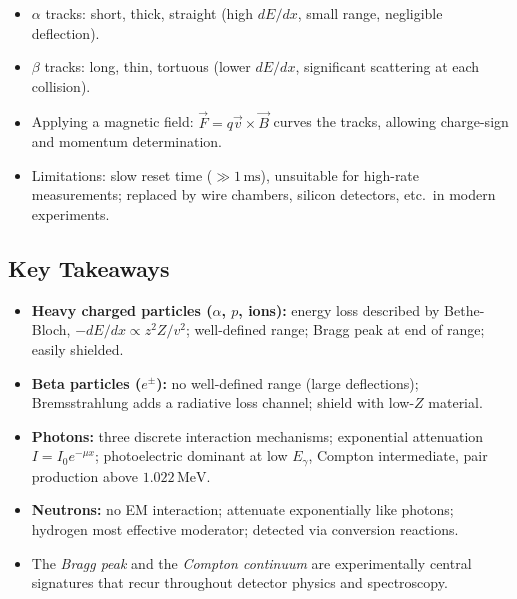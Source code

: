 \begin{itemize}
  \item $\alpha$ tracks: short, thick, straight (high $dE/dx$, small range,
  negligible deflection).
  \item $\beta$ tracks: long, thin, tortuous (lower $dE/dx$, significant
  scattering at each collision).
  \item Applying a magnetic field: $\vec{F} = q\vec{v}\times\vec{B}$ curves the
  tracks, allowing charge-sign and momentum determination.
  \item Limitations: slow reset time ($\gg 1\,\text{ms}$), unsuitable for high-rate
  measurements; replaced by wire chambers, silicon detectors, etc.\ in modern
  experiments.
\end{itemize}

\subsection*{Key Takeaways}
\begin{itemize}
  \item \textbf{Heavy charged particles ($\alpha$, $p$, ions):} energy loss described by
  Bethe-Bloch, $-dE/dx \propto z^2 Z/v^2$; well-defined range; Bragg peak at
  end of range; easily shielded.
  \item \textbf{Beta particles ($e^\pm$):} no well-defined range (large deflections);
  Bremsstrahlung adds a radiative loss channel; shield with low-$Z$ material.
  \item \textbf{Photons:} three discrete interaction mechanisms; exponential
  attenuation $I = I_0 e^{-\mu x}$; photoelectric dominant at low $E_\gamma$,
  Compton intermediate, pair production above $1.022\,\text{MeV}$.
  \item \textbf{Neutrons:} no EM interaction; attenuate exponentially like photons;
  hydrogen most effective moderator; detected via conversion reactions.
  \item The \emph{Bragg peak} and the \emph{Compton continuum} are experimentally
  central signatures that recur throughout detector physics and spectroscopy.
\end{itemize}
